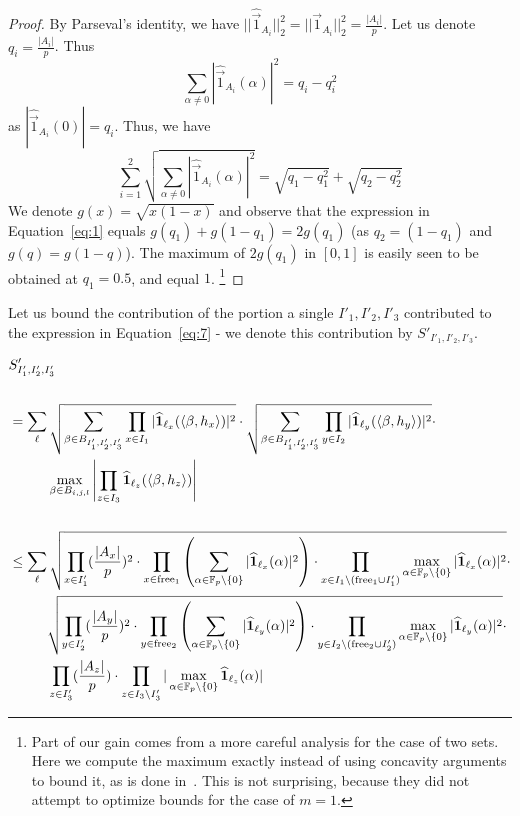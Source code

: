 \begin{proof}
By Parseval's identity, we have
$||\widehat{\vec{1}}_{A_i}||^2_2 = ||\vec{1}_{A_i}||^2_2=\frac{|A_i|}{p}$. 
Let us denote $q_i=\frac{|A_i|}{p}$.
Thus
$$\sum_{\alpha\neq 0}|\widehat{\vec{1}}_{A_i}(\alpha)|^2 = q_i - q^2_i$$
as $|\widehat{\vec{1}}_{A_i}(0)|=q_i$. Thus, we have
\begin{equation}
\label{eq:1}
\sum^2_{i=1}\sqrt{\sum_{\alpha\neq 0}|\widehat{\vec{1}}_{A_i}(\alpha)|^2} = \sqrt{q_1 - q^2_1} + \sqrt{q_2 - q^2_2}
\end{equation}
We denote $g(x)=\sqrt{x(1-x)}$ and observe that the expression in Equation~\ref{eq:1} equals $g(q_1)+g(1-q_1)=2g(q_1)$ (as $q_2=(1-q_1)$ and $g(q) = g(1-q)$).
The maximum of $2g(q_1)$ in $[0,1]$ is easily seen to be obtained at $q_1=0.5$, and equal $1$.
\footnote{Part of our gain comes from a more careful analysis for the case of two sets. Here we compute the maximum exactly instead of using concavity arguments to bound it, as is done in~\cite{EPRINT:BDIR19}. This is not surprising, because they did not attempt to optimize bounds for the case of $m=1$.}
\end{proof}
Let us bound the contribution of the portion a single $I'_1,I'_2,I'_3$ contributed to the expression
in Equation~\ref{eq:7} - 
we denote this contribution by $S'_{I'_1,I'_2,I'_3}$. 

{\allowdisplaybreaks
\begin{align}
&S'_{I'_1,I'_2,I'_3}\nonumber\\ \nonumber \\
&=\sum_{\vec{\ell}} \sqrt{\sum_{\substack{\beta\in B_{I'_1,I'_2,I'_3}}} \prod_{x\in I_1}|\widehat{\mathbf{1}}_{\ell_x}(\ip{\beta,h_x})|^2}\cdot \sqrt{\sum_{\substack{\beta\in B_{I'_1,I'_2,I'_3}}} \prod_{y\in I_2}|\widehat{\mathbf{1}}_{\ell_y}(\ip{\beta,h_y})|^2} \cdot \label{eq-8} \\ \nonumber
&\hphantom{{}=\sum_{\vec{\ell}}} \max_{\beta\in B_{i,j,l}}\left| \prod_{z\in I_3}\widehat{\mathbf{1}}_{\ell_z}(\ip{\beta,h_z})\right| \\ \nonumber \\
&\leq \sum_{\vec{\ell}} \sqrt{ \prod_{x\in I'_1}(\frac{|A_x|}{p})^2 \cdot \prod_{x\in \freeione}\left(\sum_{\alpha\in\F_p\setminus{\{0\}}} |\widehat{\mathbf{1}}_{\ell_x}(\alpha)|^2\right)\cdot \prod_{x\in I_1\setminus{(\freeione\cup I'_1})} \max_{\alpha\in\F_p\setminus{\{0\}}}|\widehat{\mathbf{1}}_{\ell_x}(\alpha)|^2 \label{eq-9}}\cdot\\\nonumber
&\hphantom{{}=\sum_{\vec{\ell}}}\sqrt{ \prod_{y\in I'_2}(\frac{|A_y|}{p})^2 \cdot \prod_{y\in \freeitwo}\left(\sum_{\alpha\in\F_p\setminus{\{0\}}} |\widehat{\mathbf{1}}_{\ell_y}(\alpha)|^2\right)\cdot \prod_{y\in I_2\setminus{(\freeitwo\cup I'_2})} \max_{\alpha\in\F_p\setminus{\{0\}}}|\widehat{\mathbf{1}}_{\ell_y}(\alpha)|^2\label{eq-10} }\cdot\\\nonumber
&\hphantom{{}=\sum_{\vec{\ell}}}\prod_{z\in I'_3}(\frac{|A_z|}{p}) \cdot \prod_{z\in I_3\setminus{I'_3}}|\max_{\alpha\in \F_p\setminus{\{0\}}}\widehat{\mathbf{1}}_{\ell_z}(\alpha)|
\end{align}}

